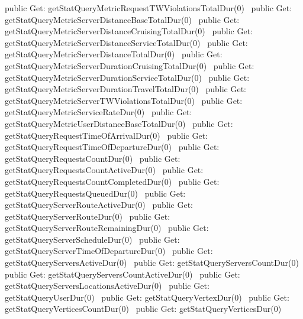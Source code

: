 public \LA{}Get: getStatQueryMetricRequestTWViolationsTotalDur(0)~{\nwtagstyle{}}\RA{}
public \LA{}Get: getStatQueryMetricServerDistanceBaseTotalDur(0)~{\nwtagstyle{}}\RA{}
public \LA{}Get: getStatQueryMetricServerDistanceCruisingTotalDur(0)~{\nwtagstyle{}}\RA{}
public \LA{}Get: getStatQueryMetricServerDistanceServiceTotalDur(0)~{\nwtagstyle{}}\RA{}
public \LA{}Get: getStatQueryMetricServerDistanceTotalDur(0)~{\nwtagstyle{}}\RA{}
public \LA{}Get: getStatQueryMetricServerDurationCruisingTotalDur(0)~{\nwtagstyle{}}\RA{}
public \LA{}Get: getStatQueryMetricServerDurationServiceTotalDur(0)~{\nwtagstyle{}}\RA{}
public \LA{}Get: getStatQueryMetricServerDurationTravelTotalDur(0)~{\nwtagstyle{}}\RA{}
public \LA{}Get: getStatQueryMetricServerTWViolationsTotalDur(0)~{\nwtagstyle{}}\RA{}
public \LA{}Get: getStatQueryMetricServiceRateDur(0)~{\nwtagstyle{}}\RA{}
public \LA{}Get: getStatQueryMetricUserDistanceBaseTotalDur(0)~{\nwtagstyle{}}\RA{}
public \LA{}Get: getStatQueryRequestTimeOfArrivalDur(0)~{\nwtagstyle{}}\RA{}
public \LA{}Get: getStatQueryRequestTimeOfDepartureDur(0)~{\nwtagstyle{}}\RA{}
public \LA{}Get: getStatQueryRequestsCountDur(0)~{\nwtagstyle{}}\RA{}
public \LA{}Get: getStatQueryRequestsCountActiveDur(0)~{\nwtagstyle{}}\RA{}
public \LA{}Get: getStatQueryRequestsCountCompletedDur(0)~{\nwtagstyle{}}\RA{}
public \LA{}Get: getStatQueryRequestsQueuedDur(0)~{\nwtagstyle{}}\RA{}
public \LA{}Get: getStatQueryServerRouteActiveDur(0)~{\nwtagstyle{}}\RA{}
public \LA{}Get: getStatQueryServerRouteDur(0)~{\nwtagstyle{}}\RA{}
public \LA{}Get: getStatQueryServerRouteRemainingDur(0)~{\nwtagstyle{}}\RA{}
public \LA{}Get: getStatQueryServerScheduleDur(0)~{\nwtagstyle{}}\RA{}
public \LA{}Get: getStatQueryServerTimeOfDepartureDur(0)~{\nwtagstyle{}}\RA{}
public \LA{}Get: getStatQueryServersActiveDur(0)~{\nwtagstyle{}}\RA{}
public \LA{}Get: getStatQueryServersCountDur(0)~{\nwtagstyle{}}\RA{}
public \LA{}Get: getStatQueryServersCountActiveDur(0)~{\nwtagstyle{}}\RA{}
public \LA{}Get: getStatQueryServersLocationsActiveDur(0)~{\nwtagstyle{}}\RA{}
public \LA{}Get: getStatQueryUserDur(0)~{\nwtagstyle{}}\RA{}
public \LA{}Get: getStatQueryVertexDur(0)~{\nwtagstyle{}}\RA{}
public \LA{}Get: getStatQueryVerticesCountDur(0)~{\nwtagstyle{}}\RA{}
public \LA{}Get: getStatQueryVerticesDur(0)~{\nwtagstyle{}}\RA{}
\nwendcode{}\nwdocspar

